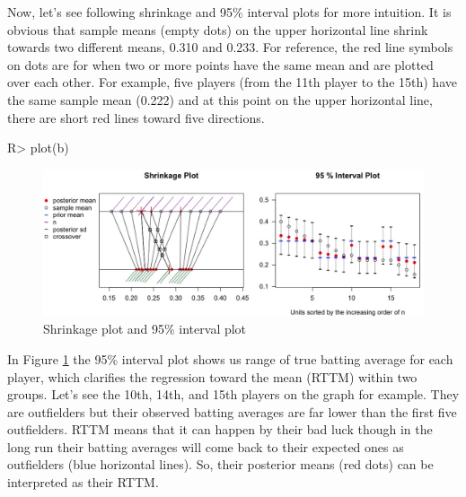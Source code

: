 \documentclass[article]{jss}
\begin{document}
Now, let's see following shrinkage and 95\% interval plots for more intuition. It is obvious that sample means (empty dots) on the upper horizontal line shrink towards two different means, 0.310 and 0.233. For reference, the red line symbols on dots are for when two or more points have the same mean and are plotted over each other. For example, five players (from the 11th player to the 15th) have the same sample mean (0.222) and at this point on the upper horizontal line, there are short red lines toward five directions.

\begin{CodeChunk}
\begin{CodeInput}
R> plot(b)
\end{CodeInput}
\end{CodeChunk}
\begin{figure}[h]
\begin{center}
\includegraphics[scale=0.3]{baseball1.png}
\caption{Shrinkage plot and 95\% interval plot}
\label{fig:baseball}
\end{center}
\end{figure}



In Figure \ref{fig:baseball} the 95\% interval plot shows us range of true batting average for each player, which clarifies the regression toward the mean (RTTM) within two groups. Let's see the 10th, 14th, and 15th players on the graph for example. They are outfielders but their observed batting averages are far lower than the first five outfielders. RTTM means that it can happen by their bad luck though in the long run their batting averages will come back to their expected ones as outfielders (blue horizontal lines). So, their posterior means (red dots) can be interpreted as their RTTM. 
\end{document}
